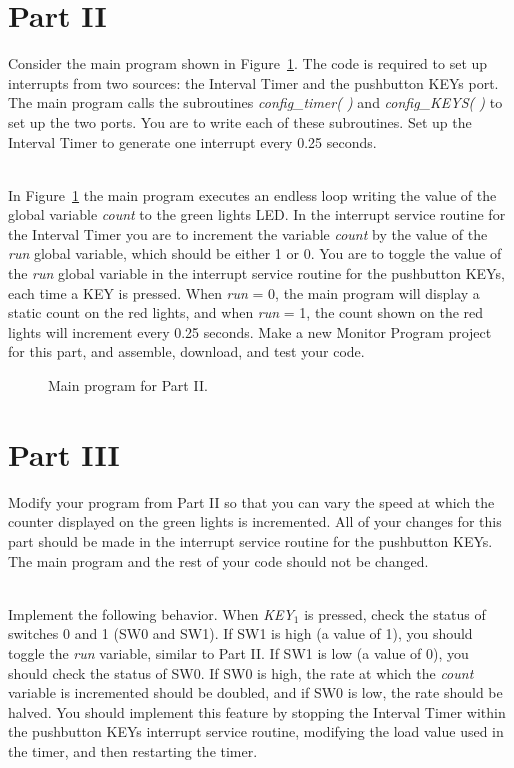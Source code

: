\documentclass[epsfig,10pt,fullpage]{article}
\begin{document}
\section*{ Part II}
Consider the main program shown in Figure~\ref{fig:code2}. The code is required to set up 
interrupts from two sources: the Interval Timer and the pushbutton KEYs port. The main program 
calls the subroutines {\it config\_timer( )} and {\it config\_KEYS( )} to set up the two ports. 
You are to write each of these subroutines. Set up the Interval Timer to generate one interrupt
every 0.25 seconds.

~\\
In Figure~\ref{fig:code2} the main program executes an endless loop writing the value of
the global variable {\it count} to the green lights LED.  In the interrupt service routine for 
the Interval Timer you are to increment the variable {\it count} by the value of the {\it run} global variable, 
which should be either 1 or 0.  You are to toggle the value of the {\it run} global variable 
in the interrupt service routine for the pushbutton KEYs, each time a KEY is pressed.
When {\it run} = 0, the main program will display a static count on the red lights,
and when {\it run} = 1, the count shown on the red lights will increment every 0.25 seconds.
Make a new Monitor Program project for this part, and assemble, download, and test your
code.

\begin{figure}[H]
\begin{center}

\end{center}
\vspace{-0.5cm}\caption{Main program for Part II.}
\label{fig:code2}
\end{figure}

\section*{ Part III}
Modify your program from Part II so that you can vary the speed at which the counter
displayed on the green lights is incremented. All of your changes for this part should be made
in the interrupt service routine for the pushbutton KEYs. The main program and the rest of
your code should not be changed.

~\\
Implement the following behavior. When {\it KEY}$_1$ is pressed, check the status of switches 0
and 1 (SW0 and SW1). If SW1 is high (a value of 1), you should toggle the {\it run} variable, 
similar to Part II. If SW1 is low (a value of 0), you should check the status of SW0. If SW0
is high, the rate at which the {\it count} variable is incremented should be doubled, and if SW0
is low, the rate should be halved. You should implement this feature by stopping the Interval Timer within
the pushbutton KEYs interrupt service routine, modifying the load value used in the
timer, and then restarting the timer.
\end{document}
